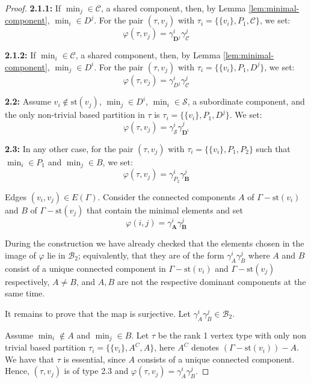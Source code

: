 \documentclass[a4paper]{amsart}
\newcommand{\G}{\Gamma}
\newcommand{\B}{\mathcal{B}}
\newcommand{\C}{\mathcal{C}}
\newcommand{\s}{\mathcal{S}}
\newcommand{\st}{\mathrm{st}}
\theoremstyle{definition}
\theoremstyle{remark}
\begin{document}
\begin{proof}
{\textbf{2.1.1:}}  If $\min_j\in\C$, a shared component, then, by Lemma \ref{lem:minimal-component},  $\min_i\in D^j$. For the pair $(\tau,v_j)$ with $\tau_i=\{\{v_i\},P_1,\C\}$, we set:
$$
\varphi(\tau,v_j)=\gamma^i_{\boldsymbol{D}^j}\gamma^j_{\boldsymbol{\C}}
$$

{\textbf{2.1.2:}} If $\min_i\in\C$, a shared component, then, by Lemma \ref{lem:minimal-component},  $\min_j\in D^i$. For the pair $(\tau,v_j)$ with $\tau_i=\{\{v_i\},P_1,D^j\}$, we set:
$$
\varphi(\tau,v_j)=\gamma^i_{D^j}\gamma^j_\C
$$

{\textbf{2.2:}} Assume $v_i\notin \st (v_j)$, $\min_j\in D^i$,   $\min_i\in\mathcal{S}$, a subordinate component, and the only non-trivial based partition in $\tau$ is $\tau_i=\{\{v_i\},P_1,D^j\}$. We set:
 $$
    \varphi(\tau,v_j)= \gamma^i_{\boldsymbol{\s}}\gamma^j_{\boldsymbol{D}^i}
    $$

    {\textbf{2.3:}} In any other case, for the pair $(\tau,v_j)$ with $\tau_i=\{\{v_i\},P_1,P_2\}$ such that  $\min_i\in P_1$ and  $\min_j\in B$, we set:
    $$
    \varphi(\tau,v_j)= \gamma^i_{P_2}\gamma^j_{\boldsymbol{B}}
    $$

    
 Edges $(v_i,v_j)\in E(\G)$. Consider the connected components $A$ of $\G-\st(v_i)$ and $B$ of $\G-\st(v_j)$  that contain the minimal elements and set
 $$
    \varphi(i,j)= \gamma^i_{\boldsymbol{A}}\gamma^j_{\boldsymbol{B}}
    $$



During the construction we have already checked that the elements chosen in the image of $\varphi$ lie in $\B_2$; equivalently,  that they are of the form $\gamma^i_{A}\gamma^j_{B}$ where  $A$ and $B$ consist of a unique  connected component in $\G-\st(v_i)$ and $\G-\st(v_j)$ respectively, $A\neq B$, and $A,B$ are not the respective dominant components at the same time. 

It remains to prove that the map is surjective. Let $\gamma^i_{A}\gamma^j_{B}\in\B_2$.



  Assume $\min_i\notin A$ and $\min_j\in B$. Let $\tau$ be the rank 1 vertex type with only non trivial based partition  $\tau_i=\{\{v_i\}, A^C, A\}$, here $A^C$ denotes $(\G-\st(v_i))-A$. We have that $\tau$ is essential, since $A$ consists of a unique connected component. Hence, $(\tau,v_j)$ is of type 2.3 and $\varphi(\tau,v_j)=\gamma^i_{A}\gamma^j_{B}$.


\end{proof}
\end{document}

